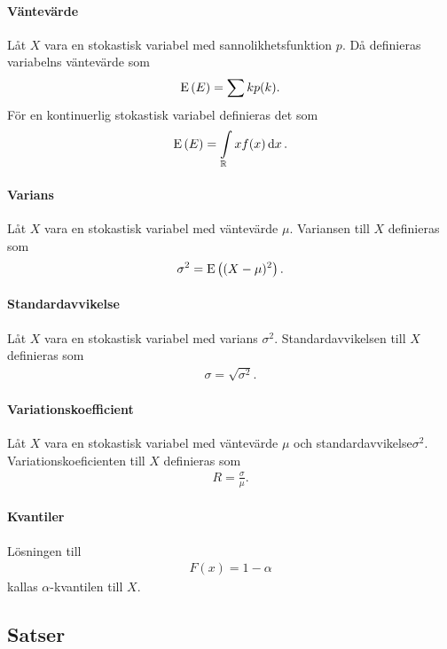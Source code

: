 \paragraph{Väntevärde}
Låt $X$ vara en stokastisk variabel med sannolikhetsfunktion $p$. Då definieras variabelns väntevärde som
\begin{align*}
	\text{E}\left(E\right) = \sum kp(k).
\end{align*}
För en kontinuerlig stokastisk variabel definieras det som
\begin{align*}
	\text{E}\left(E\right) = \int\limits_{\mathbb{R}}{}xf(x)\dd{x}.
\end{align*}

\paragraph{Varians}
Låt $X$ vara en stokastisk variabel med väntevärde $\mu$. Variansen till $X$ definieras som
\begin{align*}
	\sigma^2 = \text{E}\left((X - \mu)^2\right).
\end{align*}

\paragraph{Standardavvikelse}
Låt $X$ vara en stokastisk variabel med varians $\sigma^2$. Standardavvikelsen till $X$ definieras som
\begin{align*}
	\sigma = \sqrt{\sigma^2}.
\end{align*}

\paragraph{Variationskoefficient}
Låt $X$ vara en stokastisk variabel med väntevärde $\mu$ och standardavvikelse$\sigma^2$. Variationskoeficienten till $X$ definieras som
\begin{align*}
	R = \frac{\sigma}{\mu}.
\end{align*}

\paragraph{Kvantiler}
Lösningen till
\begin{align*}
	F(x) = 1 - \alpha
\end{align*}
kallas $\alpha$-kvantilen till $X$.

\subsection{Satser}

